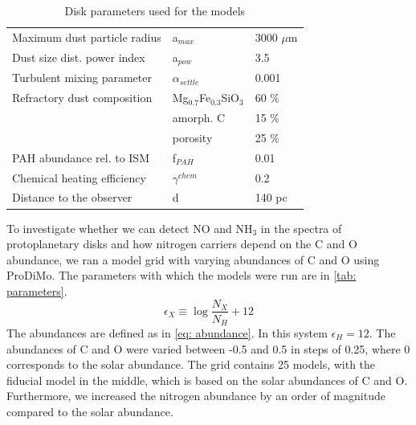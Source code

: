 \documentclass[oneside, single, authoryear, semicolon]{lion-msc}
\newcommand{\4}{$_4$}
\newcommand{\3}{$_3$}
\newcommand{\2}{$_2$}
\begin{document}
\begin{table}[!ht]
\begin{tabular}{@{}lll@{}}
Maximum dust particle radius      & a$_{max}$                   & 3000 $\mu$m                \\
Dust size dist. power index       & a$_{pow}$                   & 3.5                        \\
Turbulent mixing parameter        & $\alpha_{settle}$           & 0.001                      \\
Refractory dust composition       & Mg$_{0.7}$Fe$_{0.3}$SiO\3 & 60 \%                      \\
                                  & amorph. C                   & 15 \%                      \\
                                  & porosity                    & 25 \%                      \\
PAH abundance rel. to ISM         & f$_{PAH}$                   & 0.01                       \\
Chemical heating efficiency       & $\gamma^{chem}$             & 0.2                        \\ \midrule
Distance to the observer          & d                           & 140 pc                     \\ \bottomrule
\end{tabular}
\caption{Disk parameters used for the models}
\label{tab: parameters}
\end{table}
To investigate whether we can detect NO and NH\3 in the spectra of protoplanetary disks and how nitrogen carriers depend on the C and O abundance, 
we ran a model grid with varying abundances of C and O using ProDiMo. The parameters with which the models were run are in \autoref{tab: parameters}. 
\begin{equation}
    \epsilon_X\equiv\log\frac{N_X}{N_H}+12
\label{eq: abundance}
\end{equation}
The abundances are defined as in \autoref{eq: abundance}. In this system $\epsilon_H=12$. 
The abundances of C and O were varied between -0.5 and 0.5 in steps of 0.25, where 0 corresponds to the solar abundance. The grid contains 25 models, with the fiducial model in the middle, which is based on the solar abundances of C and O. Furthermore, we increased the nitrogen abundance by an order of magnitude compared to the solar abundance.
\end{document}
